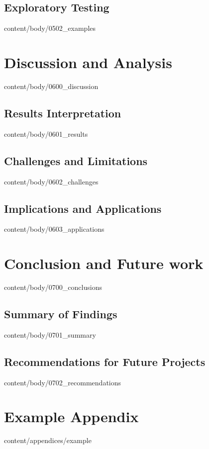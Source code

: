 \documentclass[english, tfg, loc, lof, covers, printable, firstnumbered, epsbased]{tfgtfmthesisuam}
\begin{document}
  \section{Exploratory Testing}{content/body/0502_examples}

\chapter{Discussion and Analysis}{content/body/0600_discussion}
  \section{Results Interpretation}{content/body/0601_results}
  \section{Challenges and Limitations}{content/body/0602_challenges}
  \section{Implications and Applications}{content/body/0603_applications}
  
\chapter{Conclusion and Future work}{content/body/0700_conclusions}
  \section{Summary of Findings}{content/body/0701_summary}
  \section{Recommendations for Future Projects}{content/body/0702_recommendations}

\appendix

\chapter{Example Appendix}{content/appendices/example}
\end{document}

